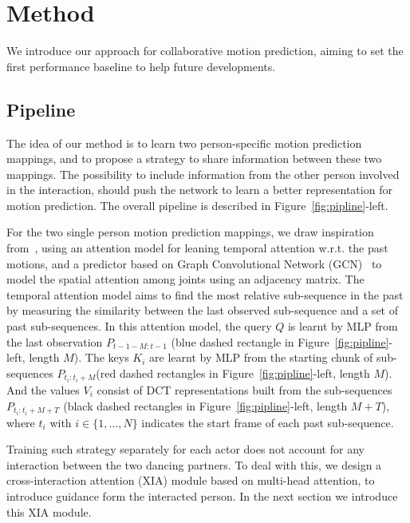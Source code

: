 
\section{Method}
We introduce our approach for collaborative motion prediction, aiming to set the first performance baseline to help future developments.

\subsection{Pipeline}
\label{sec:pipeline}
The idea of our method is to learn two person-specific motion prediction mappings, and to propose a strategy to share information between these two mappings. The possibility to include information from the other person involved in the interaction, should push the network to learn a better representation for motion prediction.
The overall pipeline is described in Figure~\ref{fig:pipline}-left.

For the two single person motion prediction mappings, we draw inspiration from~\cite{mao2020history}, using an attention model for leaning temporal attention w.r.t. the past motions, and a predictor based on Graph Convolutional Network (GCN)~\cite{kipf2016semi} to model the spatial attention among joints using an adjacency matrix. The temporal attention model aims to find the most relative sub-sequence in the past by measuring the similarity between the last observed sub-sequence and a set of past sub-sequences.
In this attention model, the query $Q$ is learnt by MLP from the last observation $P_{t-1-M:t-1}$  (blue dashed rectangle in Figure~\ref{fig:pipline}-left, length $M$). The keys $K_i$ are learnt by MLP from the starting chunk of sub-sequences $P_{t_{i}:t_{i}+M}$(red dashed rectangles in Figure~\ref{fig:pipline}-left, length $M$).  And the values $V_i$ consist of DCT representations built from the sub-sequences $P_{t_{i}:t_{i}+M+T}$ (black dashed rectangles in Figure~\ref{fig:pipline}-left, length $M+T$), where $t_i$ with $i\in\{1,\ldots,N\}$ indicates the start frame of each past sub-sequence. 

Training such strategy separately for each actor does not account for any interaction between the two dancing partners. To deal with this, we design a cross-interaction attention (XIA) module based on multi-head attention, to introduce guidance form the interacted person. In the next section we introduce this XIA module.

